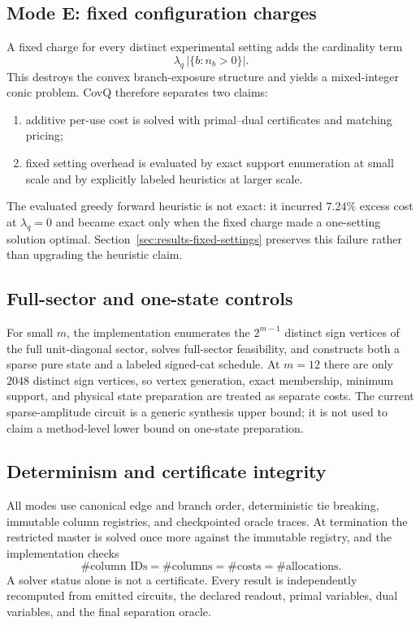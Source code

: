 \documentclass[11pt]{article}
\theoremstyle{definition}
\theoremstyle{remark}
\begin{document}
\subsection{Mode E: fixed configuration charges}
A fixed charge for every distinct experimental setting adds the cardinality term
\begin{equation}
  \lambda_q\,\big|\{b:n_b>0\}\big|.
  \label{eq:fixed-charge-objective}
\end{equation}
This destroys the convex branch-exposure structure and yields a mixed-integer conic problem. CovQ therefore separates two claims:
\begin{enumerate}[label=(\roman*)]
  \item additive per-use cost is solved with primal--dual certificates and matching pricing;
  \item fixed setting overhead is evaluated by exact support enumeration at small scale and by explicitly labeled heuristics at larger scale.
\end{enumerate}
The evaluated greedy forward heuristic is not exact: it incurred $7.24\%$ excess cost at $\lambda_q=0$ and became exact only when the fixed charge made a one-setting solution optimal. Section~\ref{sec:results-fixed-settings} preserves this failure rather than upgrading the heuristic claim.

\subsection{Full-sector and one-state controls}
For small $m$, the implementation enumerates the $2^{m-1}$ distinct sign vertices of the full unit-diagonal sector, solves full-sector feasibility, and constructs both a sparse pure state and a labeled signed-cat schedule. At $m=12$ there are only $2048$ distinct sign vertices, so vertex generation, exact membership, minimum support, and physical state preparation are treated as separate costs. The current sparse-amplitude circuit is a generic synthesis upper bound; it is not used to claim a method-level lower bound on one-state preparation.

\subsection{Determinism and certificate integrity}
All modes use canonical edge and branch order, deterministic tie breaking, immutable column registries, and checkpointed oracle traces. At termination the restricted master is solved once more against the immutable registry, and the implementation checks
\begin{equation}
  \#\text{column IDs}=\#\text{columns}=\#\text{costs}=\#\text{allocations}.
\end{equation}
A solver status alone is not a certificate. Every result is independently recomputed from emitted circuits, the declared readout, primal variables, dual variables, and the final separation oracle.
\end{document}
